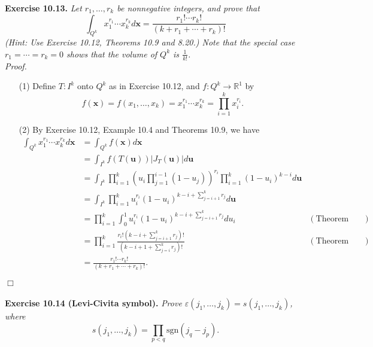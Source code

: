 \documentclass{article}
\begin{document}
\textbf{Exercise 10.13.}
\emph{Let $r_1, \ldots, r_k$ be nonnegative integers, and prove that
\[
  \int_{Q^k} x_1^{r_1} \cdots x_k^{r_k} d\mathbf{x}
  =
  \frac{r_1! \cdots r_k!}{(k+r_1+\cdots+r_k)!}
\]
(Hint: Use Exercise 10.12, Theorems 10.9 and 8.20.)
Note that the special case $r_1 = \cdots = r_k = 0$
shows that the volume of $Q^k$ is $\frac{1}{k!}$.} \\



\emph{Proof.}
\begin{enumerate}
\item[(1)]
  Define $T: I^k$ onto $Q^k$ as in Exercise 10.12,
  and $f: Q^k \to \mathbb{R}^1$ by
  \[
    f(\mathbf{x})
    = f(x_1, \ldots, x_k)
    = x_1^{r_1} \cdots x_k^{r_k}
    = \prod_{i=1}^{k} x_i^{r_i}.
  \]

\item[(2)]
  By Exercise 10.12, Example 10.4 and Theorems 10.9, we have
  \begin{align*}
    \int_{Q^k} x_1^{r_1} \cdots x_k^{r_k} d\mathbf{x}
    &=
    \int_{Q^k} f(\mathbf{x}) d\mathbf{x} \\
    &=
    \int_{I^k} f(T(\mathbf{u})) |J_T(\mathbf{u})| d\mathbf{u} \\
    &=
    \int_{I^k}
      \prod_{i=1}^{k} \left( u_i \prod_{j=1}^{i-1}(1-u_j) \right)^{r_i}
      \prod_{i=1}^{k}(1-u_i)^{k-i} d\mathbf{u} \\
    &=
    \int_{I^k}
      \prod_{i=1}^{k} u_i^{r_i} (1-u_i)^{k-i+\sum_{j=i+1}^{k}r_j} d\mathbf{u} \\
    &=
    \prod_{i=1}^{k}
      \int_{0}^{1} u_i^{r_i} (1-u_i)^{k-i+\sum_{j=i+1}^{k}r_j} du_i
      & (\text{Theorem 10.2}) \\
    &=
    \prod_{i=1}^{k}
      \frac{r_i! \left(k-i+\sum_{j=i+1}^{k}r_j\right)!}
        {\left(k-i+1+\sum_{j=i}^{k}r_j\right)!}
      & (\text{Theorem 8.20}) \\
    &=
    \frac{r_1! \cdots r_k!}{(k + r_1 + \cdots + r_k)!}.
  \end{align*}
\end{enumerate}
$\Box$ \\\\






\textbf{Exercise 10.14 (Levi-Civita symbol).}
\emph{Prove $\varepsilon(j_1, \ldots, j_k) = s(j_1, \ldots, j_k)$,
where}
\[
  s(j_1, \ldots, j_k) = \prod_{p < q} \mathrm{sgn}(j_q - j_p).
\] \\
\end{document}
